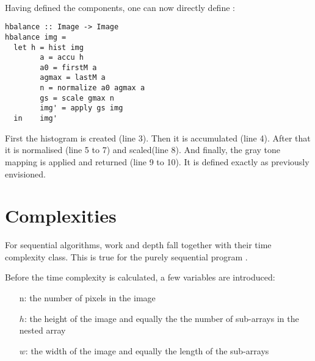   \paragraph{\algo}
  Having defined the components, one can now directly define \seq:
  \begin{lstlisting}
hbalance :: Image -> Image
hbalance img =
  let h = hist img
        a = accu h
        a0 = firstM a
        agmax = lastM a
        n = normalize a0 agmax a
        gs = scale gmax n
        img' = apply gs img
  in    img'
  \end{lstlisting}
  First the histogram is created (line 3). Then it is accumulated (line 4).
  After that it is normalised (line 5 to 7) and scaled(line 8).
  And finally, the gray tone mapping is applied and returned (line 9 to 10).
  It is defined exactly as previously envisioned.
  
\section{Complexities}
  For sequential algorithms, work and depth fall
  together with their time complexity class.
  This is true for the purely sequential
  program \seq.
  
  Before the time complexity is calculated, 
  a few variables are introduced:
  \begin{itemize}
    \item[n:] the number of pixels in the image
    \item[$h$:] the height of the image and equally the
              the number of sub-arrays in the nested array
    \item[$w$:] the width of the image and
              equally the length of the sub-arrays
  \end{itemize}
  
